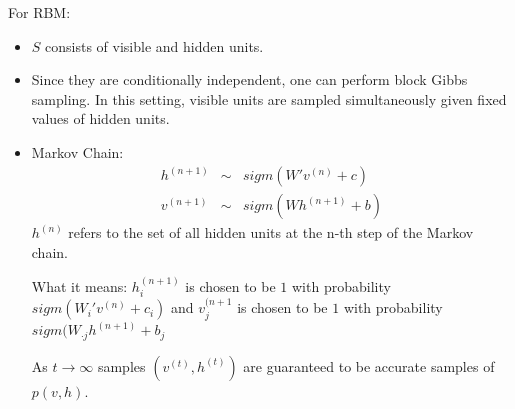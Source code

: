 For RBM:
\begin{itemize}
    \item $S$ consists of visible and hidden units.
    \item Since they are conditionally independent, one can perform block
        Gibbs sampling. In this setting, visible units are sampled
        simultaneously given fixed values of hidden units.
     \item Markov Chain:
         \begin{eqnarray*}
             h^{(n+1)} &\sim & sigm(W' v^{(n)} + c) \\
             v^{(n+1)} & \sim & sigm(W h^{(n+1)} + b)
         \end{eqnarray*}
         $h^{(n)}$ refers to the set of all hidden units at the n-th step
         of the Markov chain.

         What it means: $h_i^{(n+1)}$ is chosen to be $1$ with probability
         $sigm(W_i' v^{(n)} + c_i)$ and $v_j^{(n+1}$ is chosen to be $1$
         with probability
         $sigm(W_{\cdot j}h^{(n+1)} + b_j$

         As $t \rightarrow \infty$ samples $(v^{(t)}, h^{(t)})$ are
         guaranteed to be accurate samples of $p(v,h)$.

\end{itemize}

